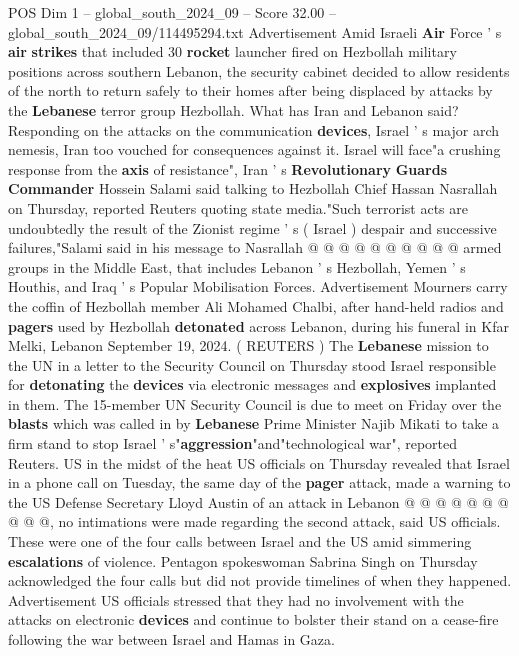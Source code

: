 \begin{textsample}{POS Dim 1 – global\_south\_2024\_09 – Score 32.00 – global\_south\_2024\_09/114495294.txt}
Advertisement Amid Israeli \textbf{Air} Force ' s \textbf{air} \textbf{strikes} that included 30 \textbf{rocket} launcher fired on Hezbollah military positions across southern Lebanon, the security cabinet decided to allow residents of the north to return safely to their homes after being displaced by attacks by the \textbf{Lebanese} terror group Hezbollah.
What has Iran and Lebanon said?
Responding on the attacks on the communication \textbf{devices}, Israel ' s major arch nemesis, Iran too vouched for consequences against it.
Israel will face"a crushing response from the \textbf{axis} of resistance", Iran ' s \textbf{Revolutionary} \textbf{Guards} \textbf{Commander} Hossein Salami said talking to Hezbollah Chief Hassan Nasrallah on Thursday, reported Reuters quoting state media."Such terrorist acts are undoubtedly the result of the Zionist regime ' s ( Israel ) despair and successive failures,"Salami said in his message to Nasrallah @ @ @ @ @ @ @ @ @ @ armed groups in the Middle East, that includes Lebanon ' s Hezbollah, Yemen ' s Houthis, and Iraq ' s Popular Mobilisation Forces.
Advertisement Mourners carry the coffin of Hezbollah member Ali Mohamed Chalbi, after hand-held radios and \textbf{pagers} used by Hezbollah \textbf{detonated} across Lebanon, during his funeral in Kfar Melki, Lebanon September 19, 2024. ( REUTERS ) The \textbf{Lebanese} mission to the UN in a letter to the Security Council on Thursday stood Israel responsible for \textbf{detonating} the \textbf{devices} via electronic messages and \textbf{explosives} implanted in them.
The 15-member UN Security Council is due to meet on Friday over the \textbf{blasts} which was called in by \textbf{Lebanese} Prime Minister Najib Mikati to take a firm stand to stop Israel ' s"\textbf{aggression}"and"technological war", reported Reuters.
US in the midst of the heat US officials on Thursday revealed that Israel in a phone call on Tuesday, the same day of the \textbf{pager} attack, made a warning to the US Defense Secretary Lloyd Austin of an attack in Lebanon @ @ @ @ @ @ @ @ @ @, no intimations were made regarding the second attack, said US officials.
These were one of the four calls between Israel and the US amid simmering \textbf{escalations} of violence.
Pentagon spokeswoman Sabrina Singh on Thursday acknowledged the four calls but did not provide timelines of when they happened.
Advertisement US officials stressed that they had no involvement with the attacks on electronic \textbf{devices} and continue to bolster their stand on a cease-fire following the war between Israel and Hamas in Gaza.

\end{textsample}
